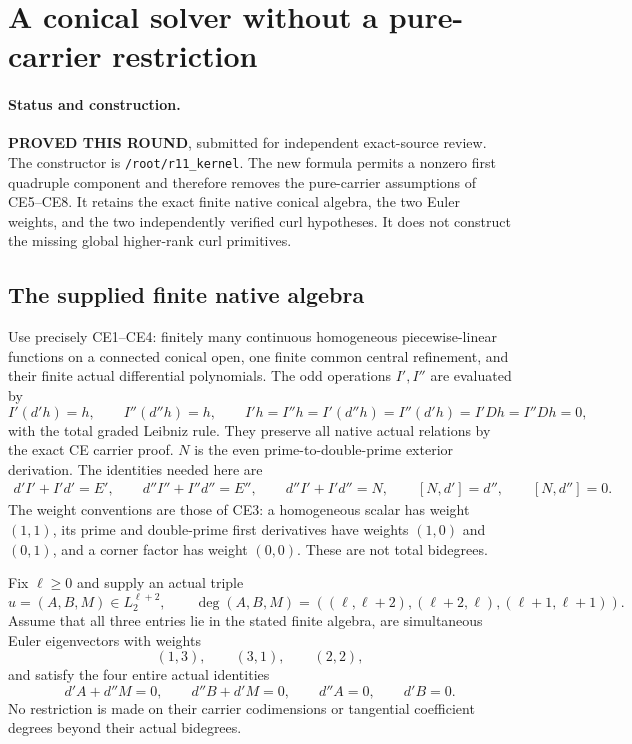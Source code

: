 \section{A conical solver without a pure-carrier restriction}
\label{sec:r11-general-conical-solver}

\paragraph{Status and construction.}
\textbf{PROVED THIS ROUND}, submitted for independent exact-source
review.  The constructor is \texttt{/root/r11\_kernel}.
The new formula permits a nonzero first quadruple component and
therefore removes the pure-carrier assumptions of CE5--CE8.
It retains the exact finite native conical algebra, the two Euler
weights, and the two independently verified curl hypotheses.
It does not construct the missing global higher-rank curl primitives.

\subsection{The supplied finite native algebra}

Use precisely CE1--CE4: finitely many continuous homogeneous
piecewise-linear functions on a connected conical open, one finite
common central refinement, and their finite actual differential
polynomials.  The odd operations $I',I''$ are evaluated by
\[
 I'(d'h)=h,\qquad I''(d''h)=h,
 \qquad I'h=I''h=I'(d''h)=I''(d'h)=I'Dh=I''Dh=0,
 \tag{CGS1}
\]
with the total graded Leibniz rule.  They preserve all native
actual relations by the exact CE carrier proof.  $N$ is the
even prime-to-double-prime exterior derivation.
The identities needed here are
\[
 \begin{gathered}
 d'I'+I'd'=E',\qquad d''I''+I''d''=E'',\qquad
 d''I'+I'd''=N,\qquad [N,d']=d'',\qquad[N,d'']=0.
 \end{gathered}
 \tag{CGS2}
\]
The weight conventions are those of CE3: a homogeneous scalar
has weight $(1,1)$, its prime and double-prime first derivatives
have weights $(1,0)$ and $(0,1)$, and a corner factor has weight
$(0,0)$.  These are not total bidegrees.

Fix $\ell\ge0$ and supply an actual triple
\[
 u=(A,B,M)\in L_2^{\ell+2},\qquad
 \deg(A,B,M)=
 ((\ell,\ell+2),(\ell+2,\ell),(\ell+1,\ell+1)).
 \tag{CGS3}
\]
Assume that all three entries lie in the stated finite algebra,
are simultaneous Euler eigenvectors with weights
\[
                    (1,3),\qquad(3,1),\qquad(2,2),
 \tag{CGS4}
\]
and satisfy the four entire actual identities
\[
 d'A+d''M=0,\qquad d''B+d'M=0,
                     \qquad d''A=0,\qquad d'B=0.
 \tag{CGS5}
\]
No restriction is made on their carrier codimensions or
tangential coefficient degrees beyond their actual bidegrees.

